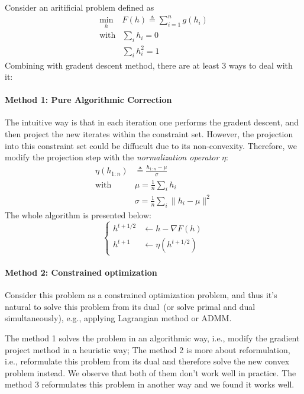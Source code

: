 \begin{example}
Consider an aritificial problem defined as
\begin{equation}\label{Eq:4:1}
\begin{array}{ll}
\min_{h}&F(h)\triangleq\sum_{i=1}^ng(h_i)\\
\mbox{with}&\sum_ih_i=0\\
&\sum_ih_i^2=1
\end{array}
\end{equation}
Combining with gradent descent method, there are at least 3 ways to deal with it:

\paragraph{Method 1: Pure Algorithmic Correction}
The intuitive way is that in each iteration one performs the gradent descent, and then project the new iterates within the constraint set. 
However, the projection into this constraint set could be diffucult due to its non-convexity. 
Therefore, we modify the projection step with the \emph{normalization operator} $\eta$:
\[
\begin{array}{ll}
\eta(h_{1:n})&\triangleq \frac{h_{1:n} - \mu}{\sigma}\\
\text{with}&\mu = \frac{1}{n}\sum_i h_{i}\\
&\sigma = \frac{1}{n}\sum_i\|h_i - \mu\|^2
\end{array}
\]
The whole algorithm is presented below:
\[
\left\{
\begin{aligned}
h^{t+1/2}&\leftarrow h - \nabla F(h)\\
h^{t+1}&\leftarrow \eta(h^{t+1/2})
\end{aligned}
\right.
\]

\paragraph{Method 2: Constrained optimization}
Consider this problem as a constrained optimization problem, and thus it's natural to solve this problem from its dual~(or solve primal and dual simultaneously), e.g., applying Lagrangian method or ADMM.

\begin{remark}
The method 1 solves the problem in an algorithmic way, i.e., modify the gradient project method in a heuristic way;
The method 2 is more about reformulation, i.e., reformulate this problem from its dual and therefore solve the new convex problem instead.
We observe that both of them don't work well in practice. The method 3 reformulates this problem in another way and we found it works well.
\end{remark}

\end{example}
